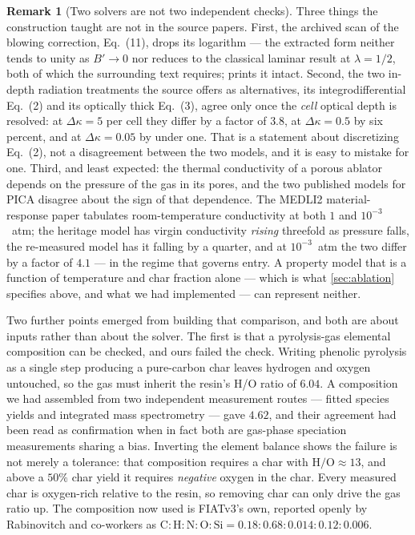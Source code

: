 \documentclass[11pt,a4paper]{article}
\theoremstyle{definition}
\newtheorem{remark}[theorem]{Remark}
\numberwithin{equation}{section}
\begin{document}
\begin{remark}[Two solvers are not two independent checks]
Three things the construction taught are not in the source papers. First, the archived scan of the blowing correction, \cite{chen1999} Eq.~(11), drops its logarithm --- the extracted form neither tends to unity as $B' \to 0$ nor reduces to the classical laminar result at $\lambda = 1/2$, both of which the surrounding text requires; \cite{milos2006} prints it intact. Second, the two in-depth radiation treatments the source offers as alternatives, its integrodifferential Eq.~(2) and its optically thick Eq.~(3), agree only once the \emph{cell} optical depth is resolved: at $\Delta\kappa = 5$ per cell they differ by a factor of $3.8$, at $\Delta\kappa = 0.5$ by six percent, and at $\Delta\kappa = 0.05$ by under one. That is a statement about discretizing Eq.~(2), not a disagreement between the two models, and it is easy to mistake for one. Third, and least expected: the thermal conductivity of a porous ablator depends on the pressure of the gas in its pores, and the two published models for PICA disagree about the sign of that dependence. The MEDLI2 material-response paper \cite{monk2021} tabulates room-temperature conductivity at both $1$ and $10^{-3}$~atm; the heritage model has virgin conductivity \emph{rising} threefold as pressure falls, the re-measured model has it falling by a quarter, and at $10^{-3}$~atm the two differ by a factor of $4.1$ --- in the regime that governs entry. A property model that is a function of temperature and char fraction alone --- which is what \cref{sec:ablation} specifies above, and what we had implemented --- can represent neither.

Two further points emerged from building that comparison, and both are about inputs rather than about the solver. The first is that a pyrolysis-gas elemental composition can be checked, and ours failed the check. Writing phenolic pyrolysis as a single step producing a pure-carbon char \cite{scoggins2017} leaves hydrogen and oxygen untouched, so the gas must inherit the resin's H/O ratio of $6.04$. A composition we had assembled from two independent measurement routes --- fitted species yields and integrated mass spectrometry --- gave $4.62$, and their agreement had been read as confirmation when in fact both are gas-phase speciation measurements sharing a bias. Inverting the element balance shows the failure is not merely a tolerance: that composition requires a char with $\mathrm{H}/\mathrm{O} \approx 13$, and above a $50\%$ char yield it requires \emph{negative} oxygen in the char. Every measured char is oxygen-rich relative to the resin, so removing char can only drive the gas ratio up. The composition now used is FIATv3's own, reported openly by Rabinovitch and co-workers \cite{rabinovitch2014} as $\mathrm{C}\!:\!\mathrm{H}\!:\!\mathrm{N}\!:\!\mathrm{O}\!:\!\mathrm{Si} = 0.18\!:\!0.68\!:\!0.014\!:\!0.12\!:\!0.006$.


\end{remark}
\end{document}
